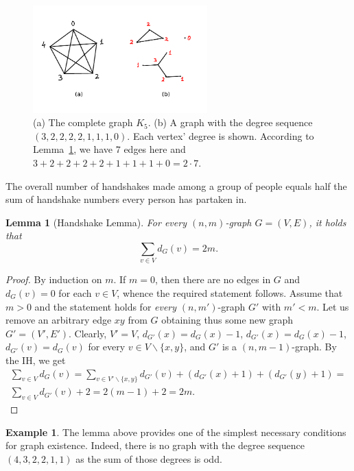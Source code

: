 \documentclass[12pt,notitlepage]{article}
\theoremstyle{plain}
\newtheorem{lemma}[thm]{Lemma}
\theoremstyle{definition}
\newtheorem{exm}[thm]{Example}
\theoremstyle{plain}
\renewcommand{\setminus}{\smallsetminus}
\newcommand{\1}{\mathbf{1}}
\newcommand{\0}{\mathbf{0}}
\begin{document}
\begin{figure}[h]
\centering
\includegraphics*[width=0.6\textwidth]{graph_degrees.pdf}
\caption{(a) The complete graph $K_5$. (b) A graph with the degree sequence $(3, 2, 2, 2, 2, 1, 1, 1, 0)$. Each vertex' degree is shown. According to Lemma~\ref{L14:l_handshake}, we have  $7$ edges here and $3 + 2 + 2 + 2 + 2 + 1 + 1 + 1 + 0 = 2 \cdot 7$.}
\end{figure}

The overall number of handshakes made among a group of people equals half the sum of handshake numbers every person has partaken in.
\begin{lemma}[Handshake Lemma]\label{L14:l_handshake}
For every $(n,m)$-graph $G = (V, E)$, it holds that $$\sum_{v \in V} d_G(v) = 2 m.$$
\end{lemma}
\begin{proof}
By induction on $m$. If $m = 0$, then there are no edges in $G$ and $d_G(v) = 0$ for each $v \in V$, whence the required statement follows. Assume that $m > 0$ and the statement holds for \emph{every} $(n,m')$-graph $G'$ with $m' < m$. Let us remove an arbitrary edge $x y$ from $G$ obtaining thus some new graph $G' = (V', E')$. Clearly, $V' = V$, $d_{G'}(x) = d_G(x) - 1$,  $d_{G'}(x) = d_G(x) - 1$, $d_{G'}(v) = d_G(v)$ for every $v \in V \setminus \{x, y\}$, and $G'$ is a $(n,m-1)$-graph. By the IH, we get
\begin{multline*}
\sum_{v \in V} d_G(v) = \sum_{v \in V' \setminus \{x, y \}} d_{G'}(v) + (d_{G'}(x) + 1) + (d_{G'}(y) + 1) =\\
\sum_{v \in V} d_{G'}(v) + 2 = 2(m-1) + 2 = 2m. 
\end{multline*}

\end{proof}

\begin{exm}
The lemma above provides one of the simplest necessary conditions for graph existence. Indeed, there is no graph with the degree sequence $(4,3,2,2,1,1)$ as the sum of those degrees is odd.
\end{exm}
\end{document}
